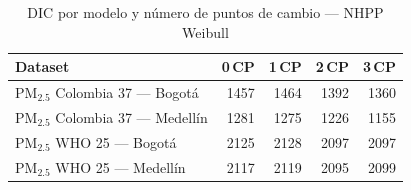 \begin{table}[htbp]
\centering
\caption{DIC por modelo y n\'{u}mero de puntos de cambio --- NHPP Weibull}
\label{tab:nhpp_dic}
\begin{tabular}{lrrrr}
\toprule
Dataset & 0\,CP & 1\,CP & 2\,CP & 3\,CP \\
\midrule
PM$_{2.5}$ Colombia 37 --- Bogot\'{a} & 1457 & 1464 & 1392 & 1360 \\
PM$_{2.5}$ Colombia 37 --- Medell\'{i}n & 1281 & 1275 & 1226 & 1155 \\
PM$_{2.5}$ WHO 25 --- Bogot\'{a} & 2125 & 2128 & 2097 & 2097 \\
PM$_{2.5}$ WHO 25 --- Medell\'{i}n & 2117 & 2119 & 2095 & 2099 \\
\bottomrule
\end{tabular}
\end{table}
